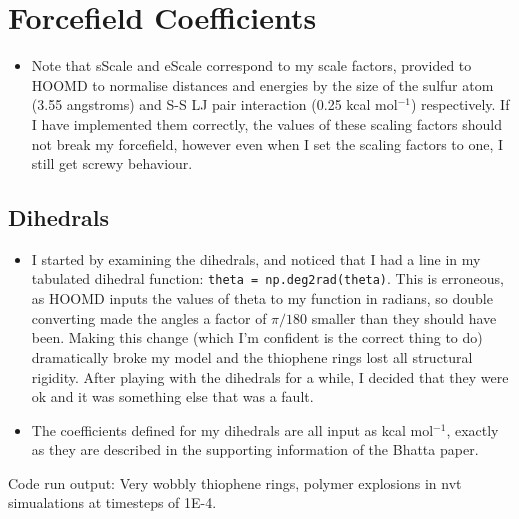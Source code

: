 \documentclass[12pt]{article}
\begin{document}
\section{Forcefield Coefficients}

\begin{itemize}
\item{Note that sScale and eScale correspond to my scale factors, provided to HOOMD to normalise distances and energies by the size of the sulfur atom (3.55 angstroms) and S-S LJ pair interaction (0.25 kcal mol$^{-1}$) respectively. If I have implemented them correctly, the values of these scaling factors should not break my forcefield, however even when I set the scaling factors to one, I still get screwy behaviour.}
\end{itemize}


\subsection{Dihedrals}
\begin{itemize}
\item{I started by examining the dihedrals, and noticed that I had a line in my tabulated dihedral function: \verb|theta = np.deg2rad(theta)|. This is erroneous, as HOOMD inputs the values of theta to my function in radians, so double converting made the angles a factor of $\pi / 180$ smaller than they should have been. Making this change (which I'm confident is the correct thing to do) dramatically broke my model and the thiophene rings lost all structural rigidity. After playing with the dihedrals for a while, I decided that they were ok and it was something else that was a fault.}
\item{The coefficients defined for my dihedrals are all input as kcal mol$^{-1}$, exactly as they are described in the supporting information of the Bhatta paper.}
\end{itemize}


Code run output: Very wobbly thiophene rings, polymer explosions in nvt simualations at timesteps of 1E-4.
\end{document}
